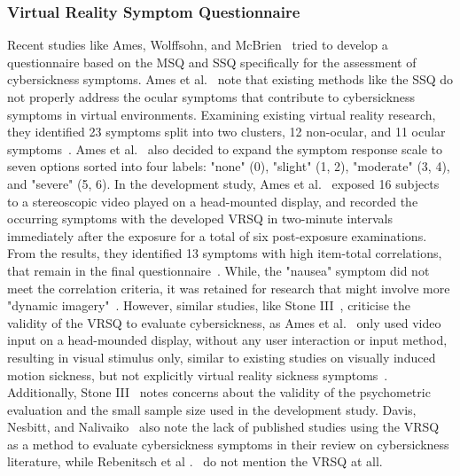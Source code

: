 \subsubsection{Virtual Reality Symptom Questionnaire}

Recent studies like Ames, Wolffsohn, and McBrien~\cite{Ames2005} tried to develop a questionnaire based on the MSQ
and SSQ specifically for the assessment of cybersickness symptoms.
Ames et al.~\cite{Ames2005} note that existing methods like the SSQ do not properly address the ocular symptoms that
contribute to cybersickness symptoms in virtual environments.
Examining existing virtual reality research, they identified 23 symptoms split into two clusters, 12 non-ocular, and
11 ocular symptoms~\cite{Ames2005}.
Ames et al.~\cite{Ames2005} also decided to expand the symptom response scale to seven options sorted into four
labels: "none" (0), "slight" (1, 2), "moderate" (3, 4), and "severe" (5, 6).
In the development study, Ames et al.~\cite{Ames2005} exposed 16 subjects to a stereoscopic video played on a
head-mounted display, and recorded the occurring symptoms with the developed VRSQ in two-minute
intervals immediately after the exposure for a total of six post-exposure examinations.
From the results, they identified 13 symptoms with high item-total correlations, that remain in the final
questionnaire~\cite{Ames2005}.
While, the "nausea" symptom did not meet the correlation criteria, it was retained for research that might involve
more "dynamic imagery"~\cite{Ames2005}.
However, similar studies, like Stone III~\cite{Stone2017}, criticise the validity of the VRSQ to evaluate
cybersickness, as Ames et al.~\cite{Ames2005} only used video input on a head-mounded display, without any user
interaction or input method, resulting in visual stimulus only, similar to existing studies on visually induced motion
sickness, but not explicitly virtual reality sickness symptoms~\cite{Stone2017}.
Additionally, Stone III~\cite{Stone2017} notes concerns about the validity of the psychometric evaluation and the
small sample size used in the development study.
Davis, Nesbitt, and Nalivaiko~\cite{Davis2014} also note the lack of published studies using the VRSQ as a method to
evaluate cybersickness symptoms in their review on cybersickness literature, while Rebenitsch et al
.~\cite{Rebenitsch2016} do not mention the VRSQ at all.
